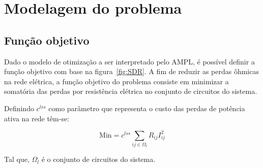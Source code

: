 \section{Modelagem do problema}

\subsection{Função objetivo}

Dado o modelo de otimização a ser interpretado pelo AMPL, é possível definir a função objetivo com base na figura~\ref{fig:SDR}.
A fim de reduzir as perdas ôhmicas na rede elétrica, a função objetivo do problema consiste em minimizar a somatória das perdas por resistência elétrica no conjunto de circuitos do sistema.

Definindo $c^{lss}$ como parâmetro que representa o custo das perdas de potência ativa na rede têm-se:

\begin{equation}
    \text{Min} = c^{lss}\sum_{ij\in\Omega_{l}}R_{ij}I_{ij}^{2}
\end{equation}

Tal que, $\Omega_{l}$ é o conjunto de circuitos do sistema.
